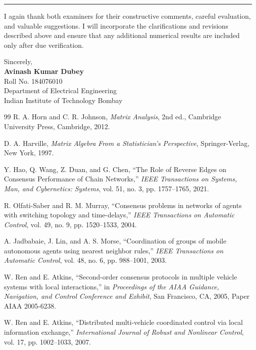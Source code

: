 \documentclass[11pt,a4paper]{article}
\newcounter{problem}
\begin{document}
\vspace{10pt}
\hrule
\vspace{8pt}
I again thank both examiners for their constructive comments, careful
evaluation, and valuable suggestions. I will incorporate the clarifications
and revisions described above and ensure that any additional numerical
results are included only after due verification.

\vspace{14pt}
Sincerely,\\[18pt]
\textbf{Avinash Kumar Dubey}\\
Roll No. 184076010\\
Department of Electrical Engineering\\
Indian Institute of Technology Bombay

\clearpage
\begin{thebibliography}{99}
R. A. Horn and C. R. Johnson,
\textit{Matrix Analysis},
2nd ed., Cambridge University Press, Cambridge, 2012.

D. A. Harville,
\textit{Matrix Algebra From a Statistician's Perspective},
Springer-Verlag, New York, 1997.

Y. Hao, Q. Wang, Z. Duan, and G. Chen,
``The Role of Reverse Edges on Consensus Performance of Chain Networks,''
\textit{IEEE Transactions on Systems, Man, and Cybernetics: Systems},
vol. 51, no. 3, pp. 1757--1765, 2021.

R. Olfati-Saber and R. M. Murray,
``Consensus problems in networks of agents with switching topology
and time-delays,''
\textit{IEEE Transactions on Automatic Control},
vol. 49, no. 9, pp. 1520--1533, 2004.

A. Jadbabaie, J. Lin, and A. S. Morse,
``Coordination of groups of mobile autonomous agents using
nearest neighbor rules,''
\textit{IEEE Transactions on Automatic Control},
vol. 48, no. 6, pp. 988--1001, 2003.

W. Ren and E. Atkins,
``Second-order consensus protocols in multiple vehicle systems
with local interactions,''
in \textit{Proceedings of the AIAA Guidance, Navigation, and
	Control Conference and Exhibit}, San Francisco, CA, 2005,
Paper AIAA 2005-6238.

W. Ren and E. Atkins,
``Distributed multi-vehicle coordinated control via local
information exchange,''
\textit{International Journal of Robust and Nonlinear Control},
vol. 17, pp. 1002--1033, 2007.


\end{thebibliography}
\end{document}
